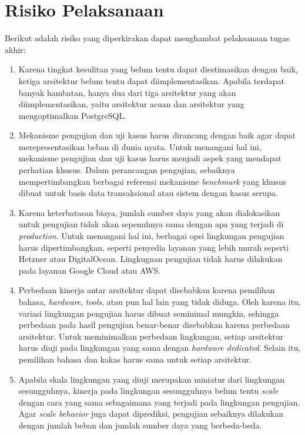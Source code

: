\section{Risiko Pelaksanaan}

Berikut adalah risiko yang diperkirakan dapat menghambat pelaksanaan tugas akhir:

\begin{enumerate}
    \item Karena tingkat kesulitan yang belum tentu dapat diestimasikan dengan baik, ketiga arsitektur belum tentu dapat diimplementasikan. Apabila terdapat banyak hambatan, hanya dua dari tiga arsitektur yang akan diimplementasikan, yaitu arsitektur acuan dan arsitektur yang mengoptimalkan PostgreSQL.
    \item Mekanisme pengujian dan uji kasus harus dirancang dengan baik agar dapat merepresentasikan beban di dunia nyata. Untuk menangani hal ini, mekanisme pengujian dan uji kasus harus menjadi aspek yang mendapat perhatian khusus. Dalam perancangan pengujian, sebaiknya mempertimbangkan berbagai referensi mekanisme \textit{benchmark} yang khusus dibuat untuk basis data transaksional atau sistem dengan kasus serupa.
    \item Karena keterbatasan biaya, jumlah sumber daya yang akan dialokasikan untuk pengujian tidak akan sepenuhnya sama dengan apa yang terjadi di \textit{production}. Untuk menangani hal ini, berbagai opsi lingkungan pengujian harus dipertimbangkan, seperti penyedia layanan yang lebih murah seperti Hetzner atau DigitalOcean. Lingkugnan pengujian tidak harus dilakukan pada layanan Google Cloud atau AWS.
    \item Perbedaan kinerja antar arsitektur dapat disebabkan karena pemilihan bahasa, \textit{hardware}, \textit{tools}, atau pun hal lain yang tidak diduga. Oleh karena itu, variasi lingkungan pengujian harus dibuat seminimal mungkin, sehingga perbedaan pada hasil pengujian benar-benar disebabkan karena perbedaan arsitektur. Untuk meminimalkan perbedaan lingkungan, setiap arsitektur harus diuji pada lingkungan yang sama dengan \textit{hardware dedicated}. Selain itu, pemilihan bahasa dan kakas harus sama untuk setiap arsitektur.
    \item Apabila skala lingkungan yang diuji merupakan miniatur dari lingkungan sesungguhnya, kinerja pada lingkungan sesungguhnya belum tentu \textit{scale} dengan cara yang sama sebagaimana yang terjadi pada lingkungan pengujian. Agar \textit{scale behavior} juga dapat diprediksi, pengujian sebaiknya dilakukan dengan jumlah beban dan jumlah sumber daya yang berbeda-beda.
\end{enumerate}